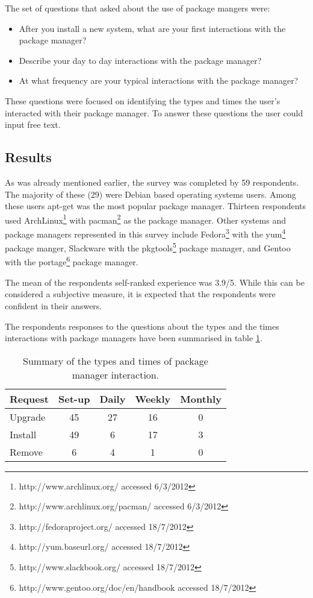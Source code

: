 The set of questions that asked about the use of package mangers were:
\begin{itemize}
  \item After you install a new system, what are your first interactions with the package manager?
  \item Describe your day to day interactions with the package manager?
  \item At what frequency are your typical interactions with the package manager?
\end{itemize}
These questions were focused on identifying the types and times the user's interacted with their package manager.
To answer these questions the user could input free text.

\subsection{Results}
As was already mentioned earlier, the survey was completed by 59 respondents.
The majority of these (29) were Debian based operating systems users.
Among these users apt-get was the most popular package manager.
Thirteen respondents used ArchLinux\footnote{http://www.archlinux.org/ accessed 6/3/2012} with pacman\footnote{http://www.archlinux.org/pacman/ accessed 6/3/2012} as the package manager.
Other systems and package managers represented in this survey include Fedora\footnote{http://fedoraproject.org/ accessed 18/7/2012} with the yum\footnote{http://yum.baseurl.org/ accessed 18/7/2012} package manger,
Slackware with the pkgtools\footnote{http://www.slackbook.org/ accessed 18/7/2012} package manager, and Gentoo with the portage\footnote{http://www.gentoo.org/doc/en/handbook accessed 18/7/2012} package manager.

The mean of the respondents self-ranked experience was 3.9/5.
While this can be considered a subjective measure, it is expected that the respondents were confident in their answers. 

The respondents responses to the questions about the types and the times interactions with package managers have been summarised in table \ref{strat.tblaction}.
\begin{table}[htp]
\centering
\begin{tabular}{l | c | c | c | c |}
Request & Set-up & Daily & Weekly & Monthly \\ \hline
Upgrade  & 45 & 27 & 16 & 0 \\
Install & 49 & 6 & 17 & 3 \\
Remove & 6 & 4 & 1 & 0\\
\end{tabular}
\caption{Summary of the types and times of package manager interaction.}
\label{strat.tblaction}
\end{table}

